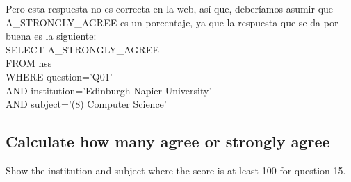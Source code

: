 \documentclass[10pt, oneside]{article}
\begin{document}
Pero esta respuesta no es correcta en la web, así que, deberíamos asumir que A\_STRONGLY\_AGREE es un porcentaje, ya que la respuesta que se da por buena es la siguiente:\\

SELECT \color{red}A\_STRONGLY\_AGREE\color{black}\\
FROM nss\\
WHERE question='Q01'\\
AND institution='Edinburgh Napier University'\\
AND subject='(8) Computer Science'\\

\subsection{Calculate how many agree or strongly agree}

Show the institution and subject where the score is at least 100 for question 15.\\
\end{document}
